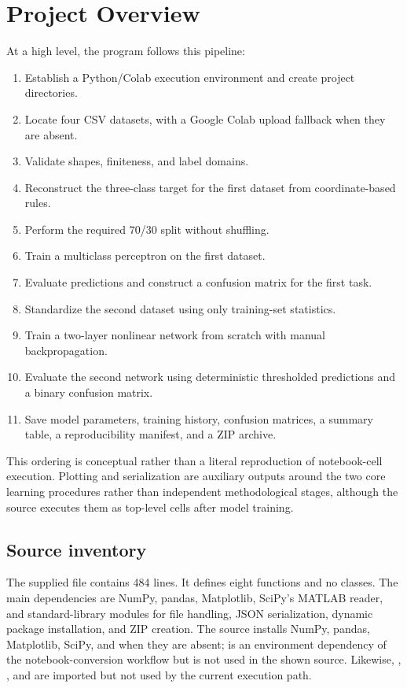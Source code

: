 \documentclass[11pt,a4paper]{article}
\newcommand{\code}[1]{\texttt{\detokenize{#1}}}
\begin{document}
\section{Project Overview}
At a high level, the program follows this pipeline:
\begin{enumerate}
    \item Establish a Python/Colab execution environment and create project directories.
    \item Locate four CSV datasets, with a Google Colab upload fallback when they are absent.
    \item Validate shapes, finiteness, and label domains.
    \item Reconstruct the three-class target for the first dataset from coordinate-based rules.
    \item Perform the required 70/30 split without shuffling.
    \item Train a multiclass perceptron on the first dataset.
    \item Evaluate predictions and construct a confusion matrix for the first task.
    \item Standardize the second dataset using only training-set statistics.
    \item Train a two-layer nonlinear network from scratch with manual backpropagation.
    \item Evaluate the second network using deterministic thresholded predictions and a binary confusion matrix.
    \item Save model parameters, training history, confusion matrices, a summary table, a reproducibility manifest, and a ZIP archive.
\end{enumerate}
This ordering is conceptual rather than a literal reproduction of notebook-cell execution. Plotting and serialization are auxiliary outputs around the two core learning procedures rather than independent methodological stages, although the source executes them as top-level cells after model training.

\subsection{Source inventory}
The supplied file contains 484 lines. It defines eight functions and no classes. The main dependencies are NumPy, pandas, Matplotlib, SciPy's MATLAB reader, and standard-library modules for file handling, JSON serialization, dynamic package installation, and ZIP creation. The source installs NumPy, pandas, Matplotlib, SciPy, and \code{nbformat} when they are absent; \code{nbformat} is an environment dependency of the notebook-conversion workflow but is not used in the shown source. Likewise, \code{loadmat}, \code{os}, and \code{math} are imported but not used by the current execution path.
\end{document}
